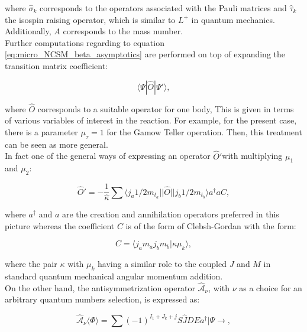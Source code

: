 \documentclass[openany]{book}
\begin{document}
where $\hat \sigma_k$ corresponds to the operators associated with the Pauli matrices and $\hat \tau_k$ the isospin raising operator, which is similar to $L^{+}$ in quantum mechanics. Additionally, $A$ corresponds to the mass number. \\ 

Further computations regarding to equation \ref{eq:micro_NCSM_beta_asymptotics} are performed on top of expanding the transition matrix coefficient: 


\begin{equation}\label{eq:micro_NCSM_beta_transition}
	\langle \Psi | \hat O |  \Psi ' \rangle,
\end{equation}

where $ \hat O$ corresponds to a suitable operator for one body, This is given in terms of various variables of interest in the reaction. For example, for the present case, there is a parameter $\mu_\tau = 1$ for the Gamow Teller operation. Then, this treatment can be seen as more general. \\

In fact one of the general ways of expressing an operator  $\hat O' $with multiplying $\mu_1$ and $\mu_2$:

\begin{equation}\label{eq:micro_NCSM_beta_operator}
	 \hat O ' = - \frac{1}{\hat \kappa} \sum \langle j_a 1/2 m_{t_a} || \hat O || j_b 1/2 m_{t_b} \rangle a^{\dagger} a C,
\end{equation}

where $a^{\dagger}$ and $a$ are the creation and annihilation operators preferred in this picture whereas the coefficient $C$ is of the form of Clebsh-Gordan with the form: 

\begin{equation}\label{eq:micro_NCSM_beta_coefficient}
	C = \langle j_a m_a j_b m_b | \kappa \mu_k \rangle,
\end{equation}

where the pair $\kappa$ with $\mu_k$ having a similar role to the coupled $J$ and $M$ in standard quantum mechanical angular momentum addition.  \\

On the other hand, the antisymmetrization operator $\hat{\mathcal{A}}_\nu$, with $\nu$ as a choice for an arbitrary quantum numbers selection, is expressed as: 

\begin{equation}\label{eq:micro_NCSM_beta_antisymmetrization}
	\hat {\mathcal{A}}_\nu  \langle \Phi \rangle  = \sum { (-1)^{I_1 + J_k + j} \hat S \hat J D E a^{\dagger} | \Psi \rightarrow },
\end{equation}
\end{document}

